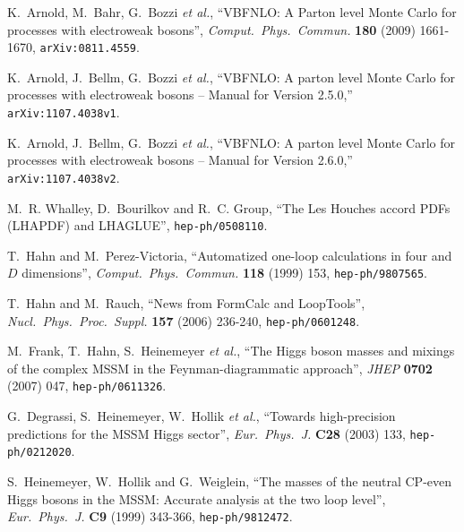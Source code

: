 \documentclass[english,12pt]{article}
\begin{document}
\providecommand{\href}[2]{#2}\begingroup\begin{thebibliography}{10}

  K.~Arnold, M.~Bahr, G.~Bozzi {\it et al.},
  ``VBFNLO: A Parton level Monte Carlo for processes with electroweak bosons'',
  {\em Comput.\ Phys.\ Commun.}  {\bf 180 } (2009)  1661-1670, \href{http://arxiv.org/abs/0811.4559}{{\tt arXiv:0811.4559}}.

  K.~Arnold, J.~Bellm, G.~Bozzi {\it et al.},
  ``VBFNLO: A parton level Monte Carlo for processes with electroweak bosons -- Manual for Version 2.5.0,''
  \href{http://arxiv.org/abs/1107.4038v1}{{\tt arXiv:1107.4038v1}}.
  
  K.~Arnold, J.~Bellm, G.~Bozzi {\it et al.},
  ``VBFNLO: A parton level Monte Carlo for processes with electroweak bosons -- Manual for Version 2.6.0,''
  \href{http://arxiv.org/abs/1107.4038v2}{{\tt arXiv:1107.4038v2}}.
  
M.~R. Whalley, D.~Bourilkov and R.~C. Group, ``The Les Houches accord PDFs
(LHAPDF) and LHAGLUE'',
\href{http://www.arXiv.org/abs/hep-ph/0508110}{{\tt hep-ph/0508110}}.

  T.~Hahn and M.~Perez-Victoria,
  ``Automatized one-loop calculations in four and $D$ dimensions'',
  {\em Comput.\ Phys.\ Commun.}  {\bf 118} (1999) 153,
\href{http://www.arXiv.org/abs/hep-ph/9807565}{{\tt hep-ph/9807565}}.

  T.~Hahn and M.~Rauch,
  ``News from FormCalc and LoopTools'',
  {\em Nucl.\ Phys.\ Proc.\ Suppl.}  {\bf 157} (2006)  236-240,
\href{http://www.arXiv.org/abs/hep-ph/0601248}{{\tt hep-ph/0601248}}.

  M.~Frank, T.~Hahn, S.~Heinemeyer {\it et al.},
  ``The Higgs boson masses and mixings of the complex MSSM in the
  Feynman-diagrammatic approach'',
  {\em JHEP} {\bf 0702} (2007) 047,
\href{http://www.arXiv.org/abs/hep-ph/0611326}{{\tt hep-ph/0611326}}.

  G.~Degrassi, S.~Heinemeyer, W.~Hollik {\it et al.},
  ``Towards high-precision predictions for the MSSM Higgs sector'',
  {\em Eur.\ Phys.\ J.} {\bf C28} (2003) 133,
\href{http://www.arXiv.org/abs/hep-ph/0212020}{{\tt hep-ph/0212020}}.

  S.~Heinemeyer, W.~Hollik and G.~Weiglein,
  ``The masses of the neutral CP-even Higgs bosons in the MSSM: Accurate analysis at the two loop level'',
  {\em Eur.\ Phys.\ J.} {\bf C9} (1999)  343-366,
\href{http://www.arXiv.org/abs/hep-ph/9812472}{{\tt hep-ph/9812472}}.


\end{thebibliography}
\end{document}
